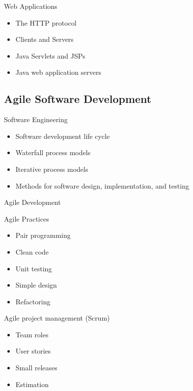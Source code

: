 \documentclass{beamer}
\begin{document}
\begin{frame}[fragile]{Web Applications}

\begin{itemize}
\item The HTTP protocol
\item Clients and Servers
\item Java Servlets and JSPs
\item Java web application servers
\end{itemize}

\end{frame}

\subsection{Agile Software Development}

\begin{frame}[fragile]{Software Engineering}

\begin{itemize}
\item Software development life cycle
\item Waterfall process models
\item Iterative process models
\item Methods for software design, implementation, and testing
\end{itemize}


\end{frame}

\begin{frame}[fragile]{Agile Development}

Agile Practices
\begin{itemize}
\item Pair programming
\item Clean code
\item Unit testing
\item Simple design
\item Refactoring
\end{itemize}
Agile project management (Scrum)
\begin{itemize}
\item Team roles
\item User stories
\item Small releases
\item Estimation
\end{itemize}


\end{frame}
\end{document}
